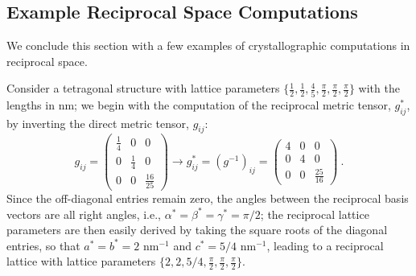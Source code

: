 \subsection{Example Reciprocal Space Computations}
We conclude this section with a few examples of crystallographic computations in reciprocal space.   
\begin{example}\label{\chabbr:ex:exam1}
Consider a tetragonal structure with lattice parameters $\{\frac{1}{2},\frac{1}{2},\frac{4}{5},\frac{\pi}{2},\frac{\pi}{2},\frac{\pi}{2}\}$ with the lengths in nm; we begin with the computation of the reciprocal metric tensor, $g^{\ast}_{ij}$, by inverting the direct metric tensor, $g_{ij}$:
\[
	g_{ij} = \begin{pmatrix}
			\frac{1}{4} & 0 & 0\\
			0 & \frac{1}{4} & 0\\
			0 & 0 & \frac{16}{25}\end{pmatrix} \rightarrow g^{\ast}_{ij} = (g^{-1})_{ij} = 
	 	    \begin{pmatrix}
			4 & 0 & 0\\
			0 & 4 & 0\\
			0 & 0 & \frac{25}{16}\end{pmatrix}\ .
\]
Since the off-diagonal entries remain zero, the angles between the reciprocal basis vectors are all right angles, i.e., $\alpha^{\ast}=\beta^{\ast}=\gamma^{\ast}=\pi/2$; the reciprocal lattice parameters are then easily derived by taking the square roots of the diagonal entries, so that $a^{\ast}=b^{\ast}=2$ nm$^{-1}$ and $c^{\ast}=5/4$ nm$^{-1}$, leading to a reciprocal lattice with lattice parameters $\{2,2,5/4,\frac{\pi}{2},\frac{\pi}{2},\frac{\pi}{2}\}$. 


\end{example}
